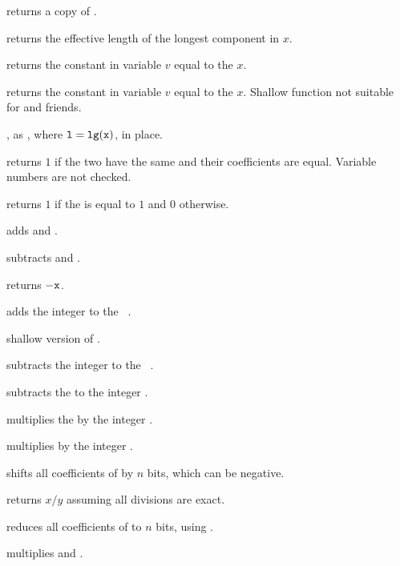 returns a copy of .

 returns the effective length of the longest
component in $x$.

 returns the constant  in variable
$v$ equal to the  $x$.

 returns the constant  in
variable $v$ equal to the  $x$. Shallow function not suitable for
 and friends.

, as , where
${\tt l} = {\tt lg(x)}$, in place.

 returns $1$ if the two  have
the same  and their coefficients are equal. Variable numbers are
not checked.

 returns $1$ if the  is equal to $1$
and $0$ otherwise.

 adds  and .

 subtracts  and .

 returns $-{\tt x}$.

 adds the integer  to the
~.

 shallow version of .

 subtracts the integer  to the
~.

 subtracts the   to the
integer .

 multiplies the   by the
integer .

 multiplies  by the integer .

 shifts all coefficients of  by $n$
bits, which can be negative.

 returns $x/y$ assuming all divisions
are exact.

 reduces all coefficients of  to
$n$ bits, using .

 multiplies  and .

